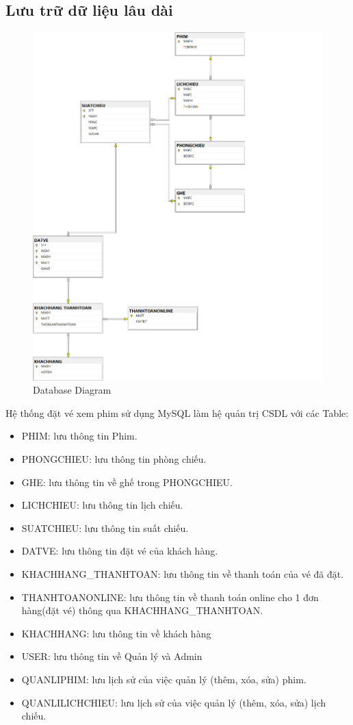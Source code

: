 \documentclass[a4paper, 12pt]{article}
\begin{document}
	\subsection{Lưu trữ dữ liệu lâu dài}
	\begin{figure}[H]
		\begin{center}
			\includegraphics[scale = 0.25]{image/4.4.png}
			\caption{Database Diagram}
		\end{center}
	\end{figure}
	Hệ thống đặt vé xem phim sử dụng MySQL làm hệ quản trị CSDL với các Table:
	\begin{itemize}
		\item PHIM: lưu thông tin Phim.
		\item PHONGCHIEU: lưu thông tin phòng chiếu.
		\item GHE: lưu thông tin về ghế trong PHONGCHIEU.
		\item LICHCHIEU: lưu thông tin lịch chiếu.
		\item SUATCHIEU: lưu thông tin suất chiếu.
		\item DATVE: lưu thông tin đặt vé của khách hàng.
		\item KHACHHANG\_THANHTOAN: lưu thông tin về thanh toán của vé đã đặt.
		\item THANHTOANONLINE: lưu thông tin về thanh toán online cho 1 đơn hàng(đặt vé) thông qua KHACHHANG\_THANHTOAN.
		\item KHACHHANG: lưu thông tin về khách hàng
		\item USER: lưu thông tin về Quản lý và Admin
		\item QUANLIPHIM: lưu lịch sử của việc quản lý (thêm, xóa, sửa) phim.
		\item QUANLILICHCHIEU: lưu lịch sử của việc quản lý (thêm, xóa, sửa) lịch chiếu.
	\end{itemize}	
\end{document}
